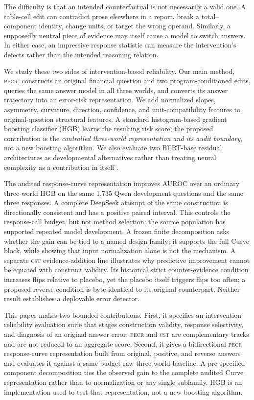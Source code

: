 \documentclass[11pt]{article}
\newcommand{\PECR}{\textsc{pecr}}
\newcommand{\CST}{\textsc{cst}}
\begin{document}
The difficulty is that an intended counterfactual is not necessarily a valid one. A table-cell edit can contradict prose elsewhere in a report, break a total--component identity, change units, or target the wrong operand. Similarly, a supposedly neutral piece of evidence may itself cause a model to switch answers. In either case, an impressive response statistic can measure the intervention's defects rather than the intended reasoning relation.

We study these two sides of intervention-based reliability. Our main method, \PECR{}, constructs an original financial question and two program-conditioned edits, queries the same answer model in all three worlds, and converts its answer trajectory into an error-risk representation. We add normalized slopes, asymmetry, curvature, direction, confidence, and unit-compatibility features to original-question structural features. A standard histogram-based gradient boosting classifier (HGB) learns the resulting risk score; the proposed contribution is the \emph{controlled three-world representation and its audit boundary}, not a new boosting algorithm. We also evaluate two BERT-base residual architectures as developmental alternatives rather than treating neural complexity as a contribution in itself \citep{devlin-etal-2019-bert}.

The audited response-curve representation improves AUROC over an ordinary three-world HGB on the same 1,735 Qwen development questions and the same three responses. A complete DeepSeek attempt of the same construction is directionally consistent and has a positive paired interval. This controls the response-call budget, but not method selection: the source population has supported repeated model development. A frozen finite decomposition asks whether the gain can be tied to a named design family; it supports the full Curve block, while showing that input normalization alone is not the mechanism. A separate \CST{} evidence-addition line illustrates why predictive improvement cannot be equated with construct validity. Its historical strict counter-evidence condition increases flips relative to placebo, yet the placebo itself triggers flips too often; a proposed reverse condition is byte-identical to its original counterpart. Neither result establishes a deployable error detector.

This paper makes two bounded contributions. First, it specifies an intervention reliability evaluation suite that stages construction validity, response selectivity, and diagnosis of an original answer error; \PECR{} and \CST{} are complementary tracks and are not reduced to an aggregate score. Second, it gives a bidirectional \PECR{} response-curve representation built from original, positive, and reverse answers and evaluates it against a same-budget raw three-world baseline. A pre-specified component decomposition ties the observed gain to the complete audited Curve representation rather than to normalization or any single subfamily. HGB is an implementation used to test that representation, not a new boosting algorithm.
\end{document}
